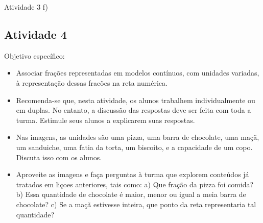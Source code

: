 \documentclass[oneside]{book}
\begin{document}
\begin{multicols}{2}
\begin{resposta*} {Atividade 3}
f)
 
 
\end{resposta*}




\subsection{Atividade 4}
  Objetivo específico:   
\begin{itemize} %
    \item       Associar frações representadas em modelos contínuos, com unidades variadas, à representação dessas fracões na reta numérica.
\end{itemize} %
  
  
\begin{itemize} %
    \item       Recomenda-se que, nesta atividade, os alunos trabalhem individualmente ou em duplas. No entanto, a discussão das respostas deve ser feita com toda a turma. Estimule seus alunos a explicarem suas respostas.
    \item       Nas imagens, as unidades são uma pizza, uma barra de chocolate, uma maçã, um sanduiche, uma fatia da torta, um biscoito, e a capacidade de um copo. Discuta isso com os alunos.
    \item       Aproveite as imagens e faça perguntas à turma que explorem conteúdos já tratados em liçoes anteriores, tais como: a) Que fração da pizza foi comida? b) Essa quantidade de chocolate é maior, menor ou igual a meia barra de chocolate? c) Se a maçã estivesse inteira, que ponto da reta representaria tal quantidade?  
\end{itemize} %


\end{multicols}
\end{document}
